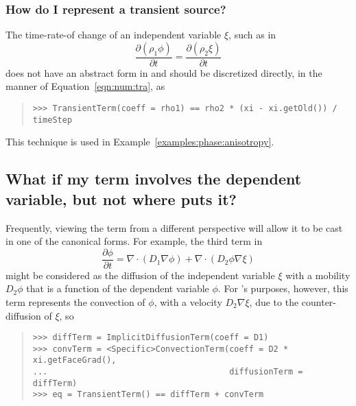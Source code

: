                 \subsubsection{How do I represent a transient source?}
                    The time-rate-of change of an independent variable
                    $\xi$, such as in
                    \[
                        \frac{\partial (\rho_1 \phi)}{\partial t}
                        = \frac{\partial (\rho_2 \xi)}{\partial t}
                    \]
                    does not have an abstract form in \FiPy{} and
                    should be discretized directly, in the manner of
                    Equation~\eqref{eqn:num:tra}, as
                    \begin{quote}
\begin{verbatim}
>>> TransientTerm(coeff = rho1) == rho2 * (xi - xi.getOld()) / timeStep
\end{verbatim}
                    \end{quote}
                    This technique is used in
                    Example~\ref{examples:phase:anisotropy}.
                    
        \subsection{What if my term involves the dependent variable, 
            but not where \FiPy{} puts it?}
            
            Frequently, viewing the term from a different perspective
            will allow it to be cast in one of the canonical forms.
            For example, the third term in
            \[
                \frac{\partial \phi}{\partial t} 
                = \nabla\cdot\left( D_1 \nabla \phi\right)
                + \nabla\cdot\left( D_2 \phi \nabla \xi\right)
            \]
            might be considered as the diffusion of the independent
            variable $\xi$ with a mobility $D_2\phi$ that is a
            function of the dependent variable $\phi$.  For \FiPy{}'s
            purposes, however, this term represents the convection of
            $\phi$, with a velocity $D_2\nabla\xi$, due to the
            counter-diffusion of $\xi$, so
            \begin{quote}
\begin{verbatim}
>>> diffTerm = ImplicitDiffusionTerm(coeff = D1)
>>> convTerm = <Specific>ConvectionTerm(coeff = D2 * xi.getFaceGrad(), 
...                                     diffusionTerm = diffTerm)
>>> eq = TransientTerm() == diffTerm + convTerm
\end{verbatim}
            \end{quote}

